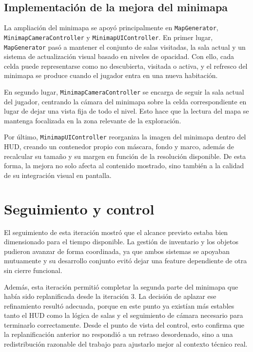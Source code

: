 \subsection{Implementación de la mejora del minimapa}
La ampliación del minimapa se apoyó principalmente en \texttt{MapGenerator},
\texttt{MinimapCameraController} y \texttt{MinimapUIController}. En primer lugar,
\texttt{MapGenerator} pasó a mantener el conjunto de salas visitadas, la sala actual y un
sistema de actualización visual basado en niveles de opacidad. Con ello, cada celda puede
representarse como no descubierta, visitada o activa, y el refresco del minimapa se produce
cuando el jugador entra en una nueva habitación.

En segundo lugar, \texttt{MinimapCameraController} se encarga de seguir la sala actual del
jugador, centrando la cámara del minimapa sobre la celda correspondiente en lugar de dejar
una vista fija de todo el nivel. Esto hace que la lectura del mapa se mantenga focalizada en
la zona relevante de la exploración.

Por último, \texttt{MinimapUIController} reorganiza la imagen del minimapa dentro del HUD,
creando un contenedor propio con máscara, fondo y marco, además de recalcular su tamaño y
su margen en función de la resolución disponible. De esta forma, la mejora no solo afecta al
contenido mostrado, sino también a la calidad de su integración visual en pantalla.

\section{Seguimiento y control}
El seguimiento de esta iteración mostró que el alcance previsto estaba bien dimensionado para el
tiempo disponible. La gestión de inventario y los objetos pudieron avanzar de forma coordinada,
ya que ambos sistemas se apoyaban mutuamente y su desarrollo conjunto evitó dejar una feature
dependiente de otra sin cierre funcional.

Además, esta iteración permitió completar la segunda parte del minimapa que había sido
replanificada desde la iteración 3. La decisión de aplazar ese refinamiento resultó adecuada,
porque en este punto ya existían más estables tanto el HUD como la lógica de salas y el
seguimiento de cámara necesario para terminarlo correctamente. Desde el punto de vista del
control, esto confirma que la replanificación anterior no respondió a un retraso desordenado,
sino a una redistribución razonable del trabajo para ajustarlo mejor al contexto técnico real.

